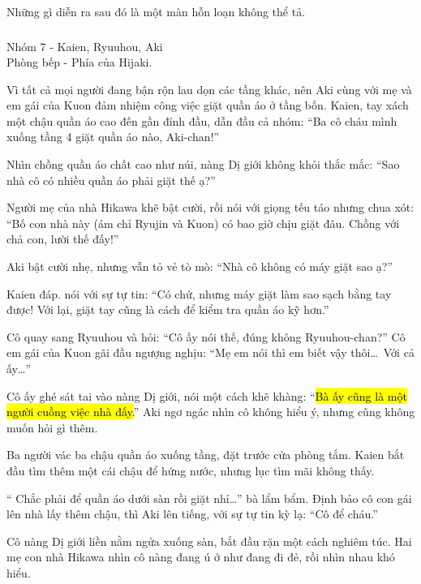 \documentclass[../main.tex]{subfiles}
\begin{document}
Những gì diễn ra sau đó là một màn hỗn loạn không thể tả.

\vspace{-40pt} \subsubsection*{\label{ep-003.IVg}} 

\begin{center}
    {\color{T7} Nhóm 7 - Kaien, Ryuuhou, Aki}\\Phòng bếp - Phía của Hijaki.
\end{center}

Vì tất cả mọi người đang bận rộn lau dọn các tầng khác, nên Aki cùng với mẹ và em gái của Kuon đảm nhiệm công việc giặt quần áo ở tầng bốn. Kaien, tay xách một chậu quần áo cao đến gần đỉnh đầu, dẫn đầu cả nhóm: ``Ba cô cháu mình xuống tầng 4 giặt quần áo nào, Aki-chan!''

Nhìn chồng quần áo chất cao như núi, nàng Dị giới không khỏi thắc mắc: ``Sao nhà cô có nhiều quần áo phải giặt thế ạ?''

Người mẹ của nhà Hikawa khẽ bật cười, rồi nói với giọng tếu táo nhưng chua xót: ``Bố con nhà này (ám chỉ Ryujin và Kuon) có bao giờ chịu giặt đâu. Chồng với chả con, lười thế đấy!''

Aki bật cười nhẹ, nhưng vẫn tỏ vẻ tò mò: ``Nhà cô không có máy giặt sao ạ?''

Kaien đáp. nói với sự tự tin: ``Có chứ, nhưng máy giặt làm sao sạch bằng tay được! Với lại, giặt tay cũng là cách để kiểm tra quần áo kỹ hơn.''

Cô quay sang Ryuuhou và hỏi: ``Cô ấy nói thế, đúng không Ryuuhou-chan?'' Cô em gái của Kuon gãi đầu ngượng nghịu: ``Mẹ em nói thì em biết vậy thôi\dots\ Với cả ấy\dots''

Cô ấy ghé sát tai vào nàng Dị giới, nói một cách khẽ khàng: ``\hl{Bà ấy cũng là một người cuồng việc nhà đấy.}'' Aki ngơ ngác nhìn cô không hiểu ý, nhưng cũng không muốn hỏi gì thêm.

Ba người vác ba chậu quần áo xuống tầng, đặt trước cửa phòng tắm. Kaien bắt đầu tìm thêm một cái chậu để hứng nước, nhưng lục tìm mãi không thấy.

``{\color{red} Chắc phải để quần áo dưới sàn rồi giặt nhỉ\dots}'' bà lẩm bẩm. Định bảo cô con gái lên nhà lấy thêm chậu, thì Aki lên tiếng, với sự tự tin kỳ lạ: ``Cô để cháu.''

Cô nàng Dị giới liền nằm ngửa xuống sàn, bắt đầu rặn một cách nghiêm túc. Hai mẹ con nhà Hikawa nhìn cô nàng đang ú ớ như đang đi đẻ, rồi nhìn nhau khó hiểu.
\end{document}
